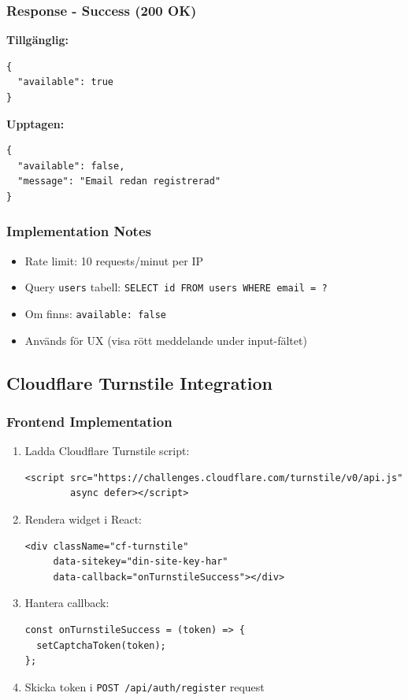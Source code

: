 \documentclass[12pt,a4paper]{article}
\begin{document}
\subsubsection{Response - Success (200 OK)}
\textbf{Tillgänglig:}
\begin{lstlisting}
{
  "available": true
}
\end{lstlisting}

\textbf{Upptagen:}
\begin{lstlisting}
{
  "available": false,
  "message": "Email redan registrerad"
}
\end{lstlisting}

\subsubsection{Implementation Notes}
\begin{itemize}[noitemsep]
  \item Rate limit: 10 requests/minut per IP
  \item Query \texttt{users} tabell: \texttt{SELECT id FROM users WHERE email = ?}
  \item Om finns: \texttt{available: false}
  \item Används för UX (visa rött meddelande under input-fältet)
\end{itemize}

\subsection{Cloudflare Turnstile Integration}

\subsubsection{Frontend Implementation}
\begin{enumerate}[noitemsep]
  \item Ladda Cloudflare Turnstile script:
\begin{verbatim}
<script src="https://challenges.cloudflare.com/turnstile/v0/api.js" 
        async defer></script>
\end{verbatim}
  \item Rendera widget i React:
\begin{lstlisting}
<div className="cf-turnstile" 
     data-sitekey="din-site-key-har"
     data-callback="onTurnstileSuccess"></div>
\end{lstlisting}
  \item Hantera callback:
\begin{lstlisting}
const onTurnstileSuccess = (token) => {
  setCaptchaToken(token);
};
\end{lstlisting}
  \item Skicka token i \texttt{POST /api/auth/register} request
\end{enumerate}
\end{document}
